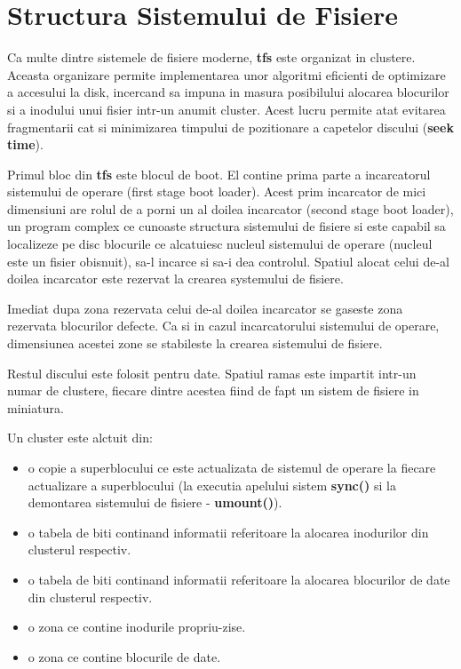 \section{Structura Sistemului de Fisiere}


Ca multe dintre sistemele de fisiere moderne, {\bf tfs} este organizat
in clustere.  Aceasta organizare permite implementarea unor algoritmi
eficienti de optimizare a accesului la disk, incercand sa impuna in
masura posibilului alocarea blocurilor si a inodului unui fisier
intr-un anumit cluster.  Acest lucru permite atat evitarea
fragmentarii cat si minimizarea timpului de pozitionare a capetelor
discului ({\bf seek time}).

Primul bloc din {\bf tfs} este blocul de boot.  El contine prima parte
a incarcatorul sistemului de operare (first stage boot loader).  Acest
prim incarcator de mici dimensiuni are rolul de a porni un al doilea
incarcator (second stage boot loader), un program complex ce cunoaste
structura sistemului de fisiere si este capabil sa localizeze pe disc
blocurile ce alcatuiesc nucleul sistemului de operare (nucleul este un
fisier obisnuit), sa-l incarce si sa-i dea controlul.  Spatiul alocat
celui de-al doilea incarcator este rezervat la crearea systemului de
fisiere.

Imediat dupa zona rezervata celui de-al doilea incarcator se gaseste
zona rezervata blocurilor defecte.  Ca si in cazul incarcatorului
sistemului de operare, dimensiunea acestei zone se stabileste la
crearea sistemului de fisiere.

Restul discului este folosit pentru date.  Spatiul ramas este impartit
intr-un numar de clustere, fiecare dintre acestea fiind de fapt un
sistem de fisiere in miniatura.

Un cluster este alctuit din:


\begin{itemize}

\item o copie a superblocului ce este actualizata de sistemul de
operare la fiecare actualizare a superblocului (la executia apelului
sistem {\bf sync()} si la demontarea sistemului de fisiere - {\bf
umount()}).

\item o tabela de biti continand informatii referitoare la
alocarea inodurilor din clusterul respectiv.

\item o tabela de biti continand informatii referitoare la
alocarea blocurilor de date din clusterul respectiv.

\item o zona ce contine inodurile propriu-zise.

\item o zona ce contine blocurile de date.

\end{itemize}

